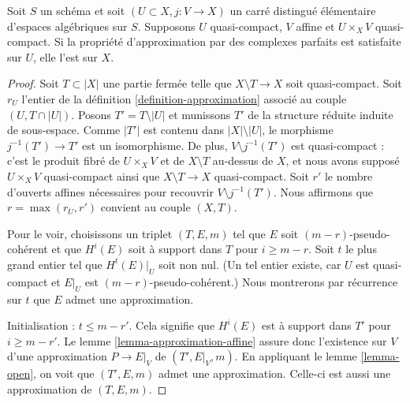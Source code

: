 \begin{lemma}
\label{lemma-induction-step}
Soit $S$ un sch\'ema et soit $(U \subset X,j : V \to X)$ un carr\'e distingu\'e
\'el\'ementaire d'espaces alg\'ebriques sur $S$. Supposons $U$ quasi-compact,
$V$ affine et $U\times_XV$ quasi-compact. Si la propri\'et\'e d'approximation
par des complexes parfaits est satisfaite sur $U$, elle l'est sur $X$.
\end{lemma}

\begin{proof}
Soit $T\subset|X|$ une partie ferm\'ee telle que
$X\setminus T\to X$ soit quasi-compact. Soit $r_U$ l'entier de la d\'efinition
\ref{definition-approximation} associ\'e au couple $(U,T\cap|U|)$.
Posons $T'=T\setminus|U|$ et munissons $T'$ de la structure r\'eduite induite
de sous-espace. Comme $|T'|$ est contenu dans $|X|\setminus|U|$, le morphisme
$j^{-1}(T')\to T'$ est un isomorphisme. De plus,
$V\setminus j^{-1}(T')$ est quasi-compact : c'est le produit fibr\'e de
$U\times_XV$ et de $X\setminus T$ au-dessus de $X$, et nous avons suppos\'e
$U\times_XV$ quasi-compact ainsi que $X\setminus T\to X$ quasi-compact.
Soit $r'$ le nombre d'ouverts affines n\'ecessaires pour recouvrir
$V\setminus j^{-1}(T')$. Nous affirmons que $r=\max(r_U,r')$ convient au
couple $(X,T)$.

\medskip\noindent
Pour le voir, choisissons un triplet $(T,E,m)$ tel que $E$ soit
$(m-r)$-pseudo-coh\'erent et que $H^i(E)$ soit \`a support dans $T$ pour
$i\geq m-r$. Soit $t$ le plus grand entier tel que $H^t(E)|_U$ soit non nul.
(Un tel entier existe, car $U$ est quasi-compact et $E|_U$ est
$(m-r)$-pseudo-coh\'erent.) Nous montrerons par r\'ecurrence sur $t$ que $E$
admet une approximation.

\medskip\noindent
Initialisation : $t\leq m-r'$. Cela signifie que $H^i(E)$ est \`a support
dans $T'$ pour $i\geq m-r'$. Le lemme
\ref{lemma-approximation-affine} assure donc l'existence sur $V$ d'une
approximation $P\to E|_V$ de $(T',E|_V,m)$. En appliquant le lemme
\ref{lemma-open}, on voit que $(T',E,m)$ admet une approximation. Celle-ci est
aussi une approximation de $(T,E,m)$.


\end{proof}
